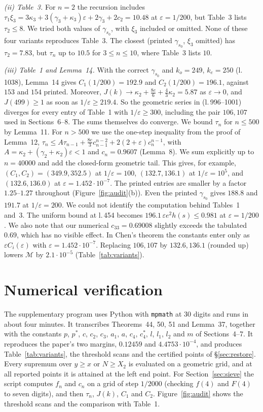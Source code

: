 \documentclass[11pt,a4paper]{amsart}
\theoremstyle{remark}
\newcommand{\eps}{\varepsilon}
\begin{document}
\emph{(ii) Table~3.} For $n=2$ the recursion includes $\tau_1\xi_3=3\kappa_3+3(\gamma_3+\kappa_3)\eps+2\gamma_3+2c_2
=10.48$ at $\eps=1/200$, but Table~3 lists $\tau_2\le8$. We tried both values of $\gamma_{s_0}$, with $\xi_3$
included or omitted. None of these four variants reproduces Table~3. The closest (printed $\gamma_{s_0}$, $\xi_3$
omitted) has $\tau_2=7.83$, but $\tau_n$ up to $10.5$ for $3\le n\le10$, where Table~3 lists $10$.

\emph{(iii) Table~1 and Lemma~14.} With the correct $\gamma_{s_0}$ and $k_o=249$, $k_e=250$ (l.\,1038),
Lemma~14 gives $C_1(1/200)=192.9$ and $C_2(1/200)=196.1$, against $153$ and $154$ printed. Moreover,
$J(k)\to\kappa_2+\frac{8e}{6}+\frac43\kappa_2=5.87$ as $\eps\to0$, and $J(499)\ge1$ as soon as $1/\eps\ge219.4$.
So the geometric series in (l.\,996--1001) diverges for every entry of Table~1 with $1/\eps\ge300$, including the
pair $106,107$ used in Sections~6--8. The sums themselves do converge. We bound $\tau_n$ for $n\le500$ by
Lemma~11. For $n>500$ we use the one-step inequality from the proof of Lemma~12,
$\tau_n\le A\tau_{n-1}+\frac{8e}{3}c_{n-1}^{n-2}+2(2+\eps)c_n^{n-1}$, with $A=\kappa_2+(\gamma_2+\kappa_2)\eps<1$
and $c_n=0.9607$ (Lemma~8). We sum explicitly up to $n=40000$ and add the closed-form geometric tail. This gives,
for example, $(C_1,C_2)=(349.9,352.5)$ at $1/\eps=100$, $(132.7,136.1)$ at $1/\eps=10^5$, and $(132.6,136.0)$ at
$\eps=1.452\cdot10^{-7}$. The printed entries are smaller by a factor $1.25$--$1.27$ throughout
(Figure~\ref{fig:audit}(b)). Even the printed $\gamma_{s_0}$ gives $188.8$ and $191.7$ at $1/\eps=200$. We could not
identify the computation behind Tables~1 and~3. The uniform bound at l.\,454 becomes
$196.1\,\eps e^2h(s)\le0.981$ at $\eps=1/200$. We also note that our numerical $c_{33}=0.69008$ slightly exceeds the
tabulated $0.69$, which has no visible effect. In Chen's theorem the constants enter only as
$\eps C_i(\eps)$ with $\eps=1.452\cdot10^{-7}$. Replacing $106,107$ by $132.6,136.1$ (rounded up) lowers
$\mathcal M$ by
$2.1\cdot10^{-5}$ (Table~\ref{tab:variants}).

\section{Numerical verification}\label{sec:numerics}

The supplementary program uses Python with \texttt{mpmath} at 30 digits and runs in
about four minutes. It transcribes Theorems~44, 50, 51 and Lemma~37, together
with the constants $p$, $p^*$, $c$, $c_2$, $c_3$, $a_1$, $a$, $c_4$, $c_4^*$, $l$, $l_1$, $l_2$ and $m$ of
Sections~4--7. It reproduces the paper's two margins, $0.12459$ and $4.4753\cdot10^{-4}$, and produces
Table~\ref{tab:variants}, the threshold scans and the certified points of \S\ref{sec:restore}. Every supremum
over $y\ge x$ or $N\ge X_2$ is evaluated on a geometric grid, and at all reported points it is attained at the
left end point. For Section~\ref{sec:sieve} the script computes $f_n$ and $c_n$ on a grid of step $1/2000$
(checking $f(4)$ and $F(4)$ to seven digits), and then $\tau_n$, $J(k)$, $C_1$ and $C_2$.
Figure~\ref{fig:audit} shows the threshold scans and the comparison with Table~1.
\end{document}
